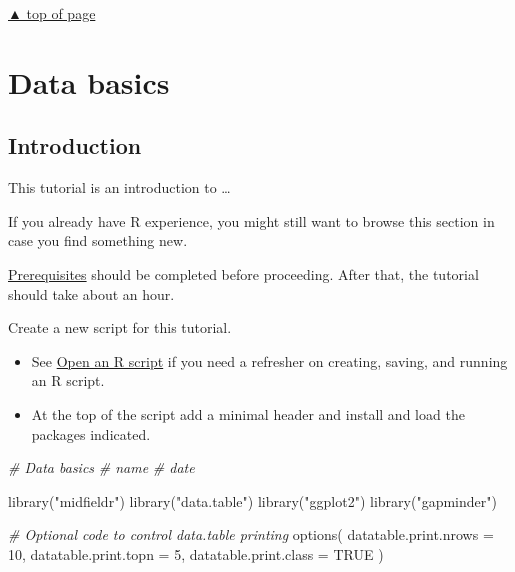 \documentclass[
]{book}
\newenvironment{Shaded}{\begin{snugshade}}{\end{snugshade}}
\newcommand{\AttributeTok}[1]{\textcolor[rgb]{0.77,0.63,0.00}{#1}}
\newcommand{\CommentTok}[1]{\textcolor[rgb]{0.56,0.35,0.01}{\textit{#1}}}
\newcommand{\ConstantTok}[1]{\textcolor[rgb]{0.00,0.00,0.00}{#1}}
\newcommand{\DecValTok}[1]{\textcolor[rgb]{0.00,0.00,0.81}{#1}}
\newcommand{\FunctionTok}[1]{\textcolor[rgb]{0.00,0.00,0.00}{#1}}
\newcommand{\NormalTok}[1]{#1}
\newcommand{\StringTok}[1]{\textcolor[rgb]{0.31,0.60,0.02}{#1}}
\providecommand{\tightlist}{%
  \setlength{\itemsep}{0pt}\setlength{\parskip}{0pt}}
\begin{document}
\protect\hyperlink{start-with-R}{▲ top of page}

\hypertarget{data-basics}{%
\chapter{Data basics}\label{data-basics}}

\hypertarget{introduction-2}{%
\section{Introduction}\label{introduction-2}}

This tutorial is an introduction to \ldots{}

If you already have R experience, you might still want to browse this section in case you find something new.

\protect\hyperlink{prerequisites}{Prerequisites} should be completed before proceeding. After that, the tutorial should take about an hour.

Create a new script for this tutorial.

\begin{itemize}
\tightlist
\item
  See \protect\hyperlink{open-an-r-script}{Open an R script} if you need a refresher on creating, saving, and running an R script.
\item
  At the top of the script add a minimal header and install and load the packages indicated.
\end{itemize}

\begin{Shaded}
\begin{Highlighting}[]
\CommentTok{\# Data basics }
\CommentTok{\# name }
\CommentTok{\# date }

\FunctionTok{library}\NormalTok{(}\StringTok{"midfieldr"}\NormalTok{)}
\FunctionTok{library}\NormalTok{(}\StringTok{"data.table"}\NormalTok{)}
\FunctionTok{library}\NormalTok{(}\StringTok{"ggplot2"}\NormalTok{)}
\FunctionTok{library}\NormalTok{(}\StringTok{"gapminder"}\NormalTok{)}

\CommentTok{\# Optional code to control data.table printing}
\FunctionTok{options}\NormalTok{(}
  \AttributeTok{datatable.print.nrows =} \DecValTok{10}\NormalTok{,}
  \AttributeTok{datatable.print.topn =} \DecValTok{5}\NormalTok{,}
  \AttributeTok{datatable.print.class =} \ConstantTok{TRUE}
\NormalTok{)}
\end{Highlighting}
\end{Shaded}
\end{document}
